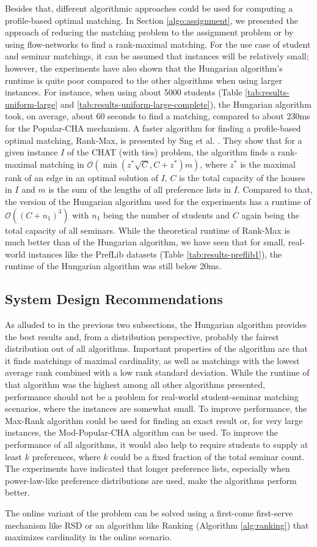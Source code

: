 Besides that, different algorithmic approaches could be used for computing a profile-based optimal matching. In Section \ref{algo:assignment}, we presented the approach of reducing the matching problem to the assignment problem or by using flow-networks to find a rank-maximal matching. For the use case of student and seminar matchings, it can be assumed that instances will be relatively small; however, the experiments have also shown that the Hungarian algorithm's runtime is quite poor compared to the other algorithms when using larger instances. For instance, when using about 5000 students (Table \ref{tab:results-uniform-large} and \ref{tab:results-uniform-large-complete}),
the Hungarian algorithm took, on average, about 60 seconds to find a matching, compared to about 230ms for the Popular-CHA mechanism. A faster algorithm for finding a profile-based optimal matching, Rank-Max, is presented by Sng et al. \cite{SngThesis}. They show that for a given instance $I$ of the CHAT (with ties) problem, the algorithm finds a rank-maximal matching in $\mathcal{O}(\min(z^*\sqrt{C}, C + z^*)m)$, where $z^*$ is the maximal rank of an edge in an optimal solution of $I$, $C$ is the total capacity of the houses in $I$ and $m$ is the sum of the lengths of all preference lists in $I$. Compared to that, the version of the Hungarian algorithm used for the experiments has a runtime of $\mathcal{O}((C+n_1)^3)$ with $n_1$ being the number of students and $C$ again being the total capacity of all seminars. While the theoretical runtime of Rank-Max is much better than of the Hungarian algorithm, we have seen that for small, real-world instances like the PrefLib datasets (Table \ref{tab:results-preflib1}), the runtime of the Hungarian algorithm was still below 20ms.

\subsection{System Design Recommendations}
As alluded to in the previous two subsections, the Hungarian algorithm provides the best results and, from a distribution perspective, probably the fairest distribution out of all algorithms. Important properties of the algorithm are that it finds matchings of maximal cardinality, as well as matchings with the lowest average rank combined with a low rank standard deviation. While the runtime of that algorithm was the highest among all other algorithms presented, performance should not be a problem for real-world student-seminar matching scenarios, where the instances are somewhat small. To improve performance, the Max-Rank algorithm \cite{SngThesis} could be used for finding an exact result or, for very large instances, the Mod-Popular-CHA algorithm can be used. To improve the performance of all algorithms, it would also help to require students to supply at least $k$ preferences, where $k$ could be a fixed fraction of the total seminar count. The experiments have indicated that longer preference lists, especially when power-law-like preference distributions are used, make the algorithms perform better.

The online variant of the problem can be solved using a first-come first-serve mechanism like RSD or an algorithm like Ranking (Algorithm \ref{alg:ranking}) that maximizes cardinality in the online scenario.